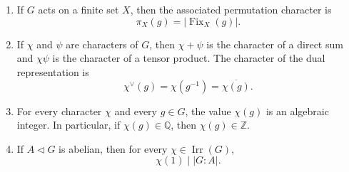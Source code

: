 \begin{theorem}
\begin{enumerate}
    \item[(xiii)] If \(G\) acts on a finite set \(X\), then the associated
    permutation character is
    \[
    \pi_X(g)=|\operatorname{Fix}_X(g)|.
    \]

    \item[(xiv)] If \(\chi\) and \(\psi\) are characters of \(G\), then
    \(\chi+\psi\) is the character of a direct sum and \(\chi\psi\) is the
    character of a tensor product. The character of the dual representation is
    \[
    \chi^\vee(g)=\chi(g^{-1})=\overline{\chi(g)}.
    \]

    \item[(xv)] For every character \(\chi\) and every \(g\in G\), the value
    \(\chi(g)\) is an algebraic integer. In particular, if \(\chi(g)\in
    \mathbb Q\), then \(\chi(g)\in\mathbb Z\).

    \item[(xvi)] If \(A\triangleleft G\) is abelian, then for every
    \(\chi\in\operatorname{Irr}(G)\),
    \[
    \chi(1)\mid |G:A|.
    \]
\end{enumerate}
\end{theorem}




























